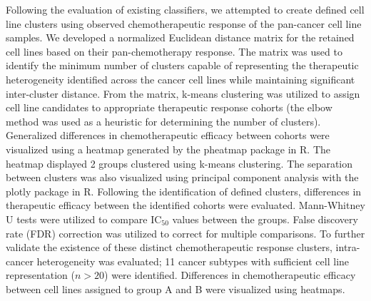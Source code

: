 \documentclass[10pt, letterpaper, twocolumn]{article}
\begin{document}
Following the evaluation of existing classifiers, we attempted to create defined cell line clusters using observed chemotherapeutic response of the pan-cancer cell line samples. We developed a normalized Euclidean distance matrix for the retained cell lines based on their pan-chemotherapy response. The matrix was used to identify the minimum number of clusters capable of representing the therapeutic heterogeneity identified across the cancer cell lines while maintaining significant inter-cluster distance. From the matrix, k-means clustering was utilized to assign cell line candidates to appropriate therapeutic response cohorts (the elbow method was used as a heuristic for determining the number of clusters). Generalized differences in chemotherapeutic efficacy between cohorts were visualized using a heatmap generated by the pheatmap package \cite{pheatmap} in R. The heatmap displayed 2 groups clustered using k-means clustering. The separation between clusters was also visualized using principal component analysis with the plotly package \cite{plotly} in R. Following the identification of defined clusters, differences in therapeutic efficacy between the identified cohorts were evaluated. Mann-Whitney U tests were utilized to compare IC$_{50}$ values between the groups. False discovery rate (FDR) correction was utilized to correct for multiple comparisons. To further validate the existence of these distinct chemotherapeutic response  clusters, intra-cancer heterogeneity was evaluated; 11 cancer subtypes with sufficient cell line representation ($n>20$) were identified. Differences in chemotherapeutic efficacy between cell lines assigned to group A and B were visualized using heatmaps.
\end{document}
